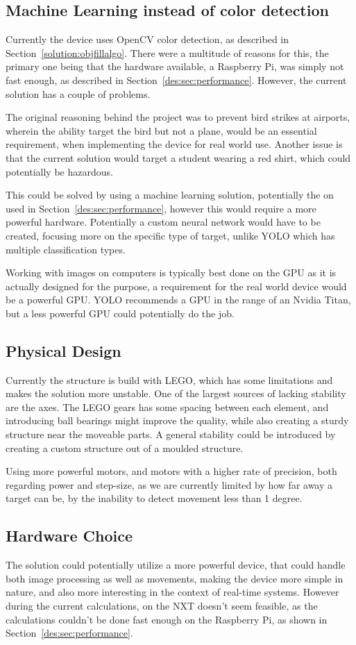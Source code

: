 \subsection{Machine Learning instead of color detection}

Currently the device uses OpenCV color detection, as described in Section~\ref{solution:objfillalgo}.
There were a multitude of reasons for this, the primary one being that the hardware available, a Raspberry Pi, was simply not fast enough, as described in Section~\ref{des:sec:performance}.
However, the current solution has a couple of problems.

The original reasoning behind the project was to prevent bird strikes at airports, wherein the ability target the bird but not a plane, would be an essential requirement, when implementing the device for real world use.
Another issue is that the current solution would target a student wearing a red shirt, which could potentially be hazardous.

This could be solved by using a machine learning solution, potentially the on used in Section~\ref{des:sec:performance}, however this would require a more powerful hardware.
Potentially a custom neural network would have to be created, focusing more on the specific type of target, unlike YOLO which has multiple classification types.

Working with images on computers is typically best done on the GPU as it is actually designed for the purpose, a requirement for the real world device would be a powerful GPU.
YOLO recommends a GPU in the range of an Nvidia Titan, but a less powerful GPU could potentially do the job.

\subsection{Physical Design}
Currently the structure is build with LEGO, which has some limitations and makes the solution more unstable.
One of the largest sources of lacking stability are the axes.
The LEGO gears has some spacing between each element, and introducing ball bearings might improve the quality, while also creating a sturdy structure near the moveable parts.
A general stability could be introduced by creating a custom structure out of a moulded structure.

Using more powerful motors, and motors with a higher rate of precision, both regarding power and step-size, as we are currently limited by how far away a target can be, by the inability to detect movement less than 1 degree.


\subsection{Hardware Choice}
The solution could potentially utilize a more powerful device, that could handle both image processing as well as movements, making the device more simple in nature, and also more interesting in the context of real-time systems.
However during the current calculations, on the NXT doesn't seem feasible, as the calculations couldn't be done fast enough on the Raspberry Pi, as shown in Section~\ref{des:sec:performance}.
 